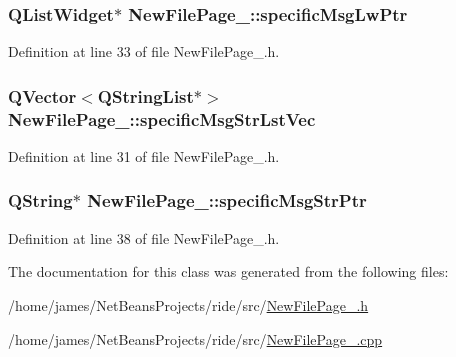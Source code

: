 \hypertarget{class_new_file_page__3_a1cf3ff30d6f22ed78cd9215c0f21697c}{
\subsubsection[{specific\-Msg\-Lw\-Ptr}]{\setlength{\rightskip}{0pt plus 5cm}Q\-List\-Widget$\ast$ New\-File\-Page\-\_\-::specific\-Msg\-Lw\-Ptr\hspace{0.3cm}{\ttfamily [private]}}}\label{class_new_file_page__3_a1cf3ff30d6f22ed78cd9215c0f21697c}


Definition at line 33 of file New\-File\-Page\-\_.\-h.

\hypertarget{class_new_file_page__3_a6d8b5daf0fff54a17b1a2acb1a4fbd0b}{
\subsubsection[{specific\-Msg\-Str\-Lst\-Vec}]{\setlength{\rightskip}{0pt plus 5cm}Q\-Vector$<$Q\-String\-List$\ast$$>$ New\-File\-Page\-\_\-::specific\-Msg\-Str\-Lst\-Vec\hspace{0.3cm}{\ttfamily [private]}}}\label{class_new_file_page__3_a6d8b5daf0fff54a17b1a2acb1a4fbd0b}


Definition at line 31 of file New\-File\-Page\-\_.\-h.

\hypertarget{class_new_file_page__3_aabe7247bb4d562591c46d245c1d71ad0}{
\subsubsection[{specific\-Msg\-Str\-Ptr}]{\setlength{\rightskip}{0pt plus 5cm}Q\-String$\ast$ New\-File\-Page\-\_\-::specific\-Msg\-Str\-Ptr\hspace{0.3cm}{\ttfamily [private]}}}\label{class_new_file_page__3_aabe7247bb4d562591c46d245c1d71ad0}


Definition at line 38 of file New\-File\-Page\-\_.\-h.



The documentation for this class was generated from the following files\-:\begin{DoxyCompactItemize}
\item 
/home/james/\-Net\-Beans\-Projects/ride/src/\hyperlink{_new_file_page__3_8h}{New\-File\-Page\-\_.\-h}\item 
/home/james/\-Net\-Beans\-Projects/ride/src/\hyperlink{_new_file_page__3_8cpp}{New\-File\-Page\-\_.\-cpp}\end{DoxyCompactItemize}
